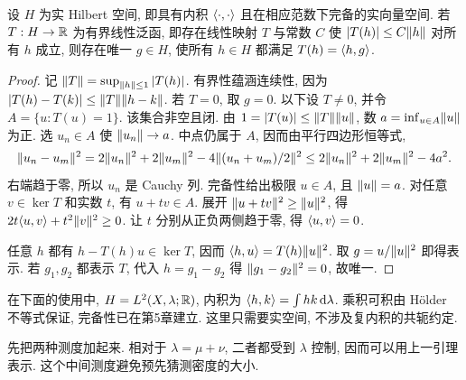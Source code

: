 \begin{lemma}\label{ra:c9:hilbert}
设 $H$ 为实 Hilbert 空间, 即具有内积 $\langle \cdot,\cdot\rangle$ 且在相应范数下完备的实向量空间. 若 $T:H\to\mathbb R$ 为有界线性泛函, 即存在线性映射 $T$ 与常数 $C$ 使 $|T(h)|\le C\lVert h\rVert$ 对所有 $h$ 成立, 则存在唯一 $g\in H$, 使所有 $h\in H$ 都满足 $T(h)=\langle h,g\rangle$.
\end{lemma}
\begin{proof}
记 $\lVert T\rVert=\sup_{\lVert h\rVert\le1}|T(h)|$. 有界性蕴涵连续性, 因为 $|T(h)-T(k)|\le\lVert T\rVert\lVert h-k\rVert$. 若 $T=0$, 取 $g=0$. 以下设 $T\ne0$, 并令 $A=\{u:T(u)=1\}$. 该集合非空且闭. 由 $1=|T(u)|\le\lVert T\rVert\lVert u\rVert$, 数 $a=\inf_{u\in A}\lVert u\rVert$ 为正. 选 $u_n\in A$ 使 $\lVert u_n\rVert\to a$. 中点仍属于 $A$, 因而由平行四边形恒等式,
\[
 \lVert u_n-u_m\rVert^2
 =2\lVert u_n\rVert^2+2\lVert u_m\rVert^2
   -4\lVert (u_n+u_m)/2\rVert^2
 \le2\lVert u_n\rVert^2+2\lVert u_m\rVert^2-4a^2.
\]
右端趋于零, 所以 $u_n$ 是 Cauchy 列. 完备性给出极限 $u\in A$, 且 $\lVert u\rVert=a$. 对任意 $v\in\ker T$ 和实数 $t$, 有 $u+tv\in A$. 展开 $\lVert u+tv\rVert^2\ge\lVert u\rVert^2$, 得 $2t\langle u,v\rangle+t^2\lVert v\rVert^2\ge0$. 让 $t$ 分别从正负两侧趋于零, 得 $\langle u,v\rangle=0$.

任意 $h$ 都有 $h-T(h)u\in\ker T$, 因而 $\langle h,u\rangle=T(h)\lVert u\rVert^2$. 取 $g=u/\lVert u\rVert^2$ 即得表示. 若 $g_1,g_2$ 都表示 $T$, 代入 $h=g_1-g_2$ 得 $\lVert g_1-g_2\rVert^2=0$, 故唯一.
\end{proof}
在下面的使用中, $H=L^2(X,\lambda;\mathbb R)$, 内积为 $\langle h,k\rangle=\int hk\,\mathrm d\lambda$. 乘积可积由 Hölder 不等式保证, 完备性已在第5章建立. 这里只需要实空间, 不涉及复内积的共轭约定.

先把两种测度加起来. 相对于 $\lambda=\mu+\nu$, 二者都受到 $\lambda$ 控制, 因而可以用上一引理表示. 这个中间测度避免预先猜测密度的大小.

